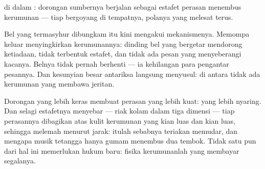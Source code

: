 \begin{omfigure}

{\small {} di dalam : dorongan sumbernya berjalan sebagai
estafet perasan menembus kerumunan  --- tiap 
bergoyang di tempatnya, polanya yang melesat terus.}
\end{omfigure}

\begin{example}\label{ex:g7:sound-production:jar}
Bel yang termasyhur dibungkam itu kini mengakui mekanismenya. Memompa
keluar  menyingkirkan kerumunannya: dinding bel yang bergetar
mendorong ketiadaan, tidak terbentuk estafet, dan tidak ada pesan yang
menyeberangi kacanya. Belnya tidak pernah berhenti --- ia kehilangan
para pengantar pesannya. Dan kesunyian besar antariksa langsung
menyusul: di antara  tidak ada kerumunan yang membawa jeritan.
\end{example}

\begin{example}\label{ex:g7:sound-production:loud}
Dorongan yang lebih keras membuat perasan yang lebih kuat:  yang
lebih nyaring. Dan selagi estafetnya menyebar --- riak kolam dalam
tiga dimensi --- tiap perasannya dibagikan atas kulit kerumunan yang
kian luas dan kian luas, sehingga melemah menurut jarak: itulah
sebabnya teriakan memudar, dan mengapa musik tetangga hanya gumam
menembus dua tembok. Tidak satu pun dari hal ini memerlukan hukum
baru: fisika kerumunanlah yang membayar segalanya.
\end{example}

